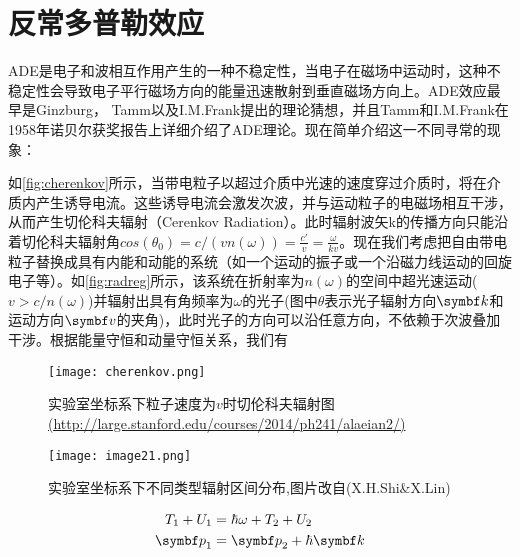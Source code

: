 \section{反常多普勒效应}\label{sec:quantum}
ADE是电子和波相互作用产生的一种不稳定性\cite{RN782}，当电子在磁场中运动时，这种不稳定性会导致电子平行磁场方向的能量迅速散射到垂直磁场方向上。ADE效应最早是Ginzburg\cite{RN1352}， Tamm\cite{RN2008}以及I.M.Frank\cite{RN2009}提出的理论猜想，并且Tamm和I.M.Frank在1958年诺贝尔获奖报告上详细介绍了ADE理论。现在简单介绍这一不同寻常的现象：\par
如\autoref{fig:cherenkov}所示，当带电粒子以超过介质中光速的速度穿过介质时，将在介质内产生诱导电流。这些诱导电流会激发次波，并与运动粒子的电磁场相互干涉，从而产生切伦科夫辐射（Cerenkov Radiation\cite{RN1861}）。此时辐射波矢k的传播方向只能沿着切伦科夫辐射角$cos(θ_0)=c/(vn(\omega))=\frac{c'}{v}=\frac{\omega}{kv}$。现在我们考虑把自由带电粒子替换成具有内能和动能的系统（如一个运动的振子或一个沿磁力线运动的回旋电子等）。如\autoref{fig:radreg}所示，该系统在折射率为$n(\omega)$的空间中超光速运动($v>c/n(ω) $)并辐射出具有角频率为$ω$的光子(图中$θ$表示光子辐射方向$\vk$和运动方向$\vv$的夹角)，此时光子的方向可以沿任意方向，不依赖于次波叠加干涉。根据能量守恒和动量守恒关系，我们有
\begin{figure}[ht]
\centering
\texttt{[image: cherenkov.png]}
\caption{\label{fig:cherenkov}实验室坐标系下粒子速度为$v$时切伦科夫辐射图\href{http://large.stanford.edu/courses/2014/ph241/alaeian2/}{(http://large.stanford.edu/courses/2014/ph241/alaeian2/)}		}
\end{figure}
\begin{figure}
\centering
\texttt{[image: image21.png]}
\caption{\label{fig:radreg}实验室坐标系下不同类型辐射区间分布,图片改自(X.H.Shi\&X.Lin)\cite{shi2018superlight}}
\end{figure}
\begin{equation}\label{eq:UT}
\begin{aligned}
T_1+U_1&=\hbar \omega+T_2+U_2 \\
\vp_1&=\vp_2+\hbar \vk 
\end{aligned}
\end{equation}

